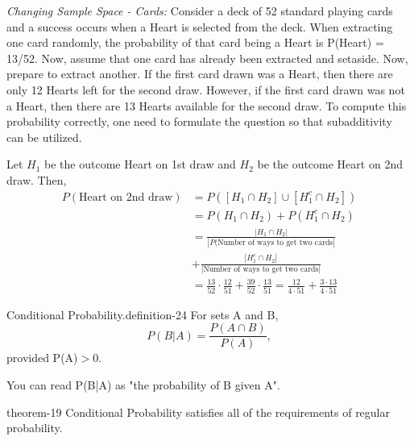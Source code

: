 \documentclass[10pt,]{book}
\numberwithin{equation}{section}
\newcommand{\gt}{>}
\begin{document}
\par
\hypertarget{p-545}{}%
\emph{Changing Sample Space - Cards:} Consider a deck of 52 standard playing cards and a success occurs when a Heart is selected from the deck. When extracting one card randomly, the probability	of that card being a Heart is P(Heart) = 13/52. Now, assume that one card has already been extracted and setaside.  Now, prepare to extract another. If the first card drawn was a Heart, then there are only 12 Hearts left for the second draw. However, if the first card drawn was not a Heart, then there are 13 Hearts available for the second draw. To compute this probability correctly, one need to formulate the question so that subadditivity can be utilized.%
\par
\hypertarget{p-546}{}%
Let \(H_1\) be the outcome Heart on 1st draw and \(H_2\) be the outcome Heart on 2nd draw. Then,%
\begin{align*}
P(\text{Heart on 2nd draw}) & = P( [ H_1 \cap H_2 ] \cup [ H_1^c \cap H_2 ] )\\
& = P( H_1 \cap H_2 ) + P( H_1^c \cap H_2 )\\
& = \frac{ | H_1 \cap H_2 |}{| P( \text{Number of ways to get two cards} | }\\
& + \frac{ | H_1^c \cap H_2 | }{ | \text{Number of ways to get two cards} | }\\
& = \frac{13}{52} \cdot \frac{12}{51} + \frac{39}{52} \cdot \frac{13}{51} = \frac{12}{4 \cdot 51} + \frac{3 \cdot 13}{4 \cdot 51}	
\end{align*}
%
\par
\hypertarget{p-547}{}%
\begin{definition}{Conditional Probability.}{definition-24}%
\hypertarget{p-548}{}%
For sets A and B,%
\begin{equation*}
P(B | A) = \frac{P(A \cap B)}{ P(A) },
\end{equation*}
provided P(A)\(\gt 0\).%
\end{definition}
%
\par
\hypertarget{p-549}{}%
You can read P(B|A) as "the probability of B given A".%
\par
\hypertarget{p-550}{}%
\begin{theorem}{}{}{theorem-19}%
\hypertarget{p-551}{}%
Conditional Probability satisfies all of the requirements of regular probability.%
\end{theorem}
\end{document}
